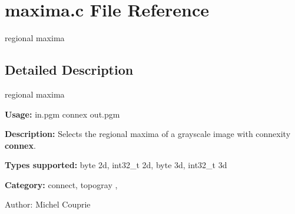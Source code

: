 \section{maxima.c File Reference}
\label{maxima_8c}
regional maxima  




\label{_details}
\subsection{Detailed Description}
regional maxima 

{\bf Usage:} in.pgm connex out.pgm

{\bf Description:} Selects the regional maxima of a grayscale image with connexity {\bf connex}.

{\bf Types supported:} byte 2d, int32\_\-t 2d, byte 3d, int32\_\-t 3d

{\bf Category:} connect, topogray ,

\begin{Desc}
\item[Author:]Michel Couprie \end{Desc}
